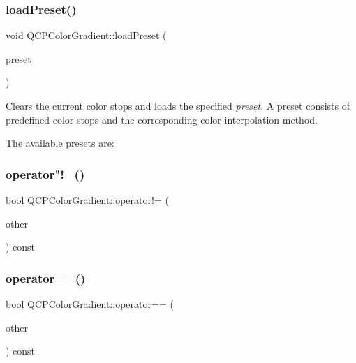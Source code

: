 \mbox{\label{class_q_c_p_color_gradient_aa0aeec1528241728b9671bf8e60b1622}} 
\subsubsection{\texorpdfstring{load\+Preset()}{loadPreset()}}
{\footnotesize\ttfamily void Q\+C\+P\+Color\+Gradient\+::load\+Preset (\begin{DoxyParamCaption}\item[{\hyperlink{class_q_c_p_color_gradient_aed6569828fee337023670272910c9072}{Gradient\+Preset}}]{preset }\end{DoxyParamCaption})}

Clears the current color stops and loads the specified {\itshape preset}. A preset consists of predefined color stops and the corresponding color interpolation method.

The available presets are\+:  \mbox{\label{class_q_c_p_color_gradient_ad26a10e3beaef4fc6f2553d1a9756087}} 
\subsubsection{\texorpdfstring{operator"!=()}{operator!=()}}
{\footnotesize\ttfamily bool Q\+C\+P\+Color\+Gradient\+::operator!= (\begin{DoxyParamCaption}\item[{const \hyperlink{class_q_c_p_color_gradient}{Q\+C\+P\+Color\+Gradient} \&}]{other }\end{DoxyParamCaption}) const\hspace{0.3cm}{\ttfamily [inline]}}

\mbox{\label{class_q_c_p_color_gradient_a7f3478c33c59aa3c03b9ea1f809877fa}} 
\subsubsection{\texorpdfstring{operator==()}{operator==()}}
{\footnotesize\ttfamily bool Q\+C\+P\+Color\+Gradient\+::operator== (\begin{DoxyParamCaption}\item[{const \hyperlink{class_q_c_p_color_gradient}{Q\+C\+P\+Color\+Gradient} \&}]{other }\end{DoxyParamCaption}) const}

